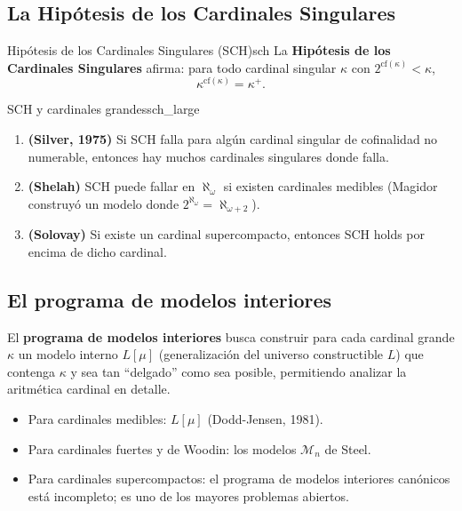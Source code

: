 \subsection{La Hipótesis de los Cardinales Singulares}

\begin{definicion}{Hipótesis de los Cardinales Singulares (SCH)}{sch}
La \textbf{Hipótesis de los Cardinales Singulares} afirma: para todo cardinal singular $\kappa$ con $2^{\mathrm{cf}(\kappa)} < \kappa$,
\[
  \kappa^{\mathrm{cf}(\kappa)} = \kappa^+.
\]
\end{definicion}

\begin{teorema}{SCH y cardinales grandes}{sch_large}
\begin{enumerate}[leftmargin=2em, label=(\roman*)]
  \item \textbf{(Silver, 1975)} Si SCH falla para algún cardinal singular de cofinalidad no numerable, entonces hay muchos cardinales singulares donde falla.
  \item \textbf{(Shelah)} SCH puede fallar en $\aleph_\omega$ si existen cardinales medibles (Magidor construyó un modelo donde $2^{\aleph_\omega} = \aleph_{\omega+2}$).
  \item \textbf{(Solovay)} Si existe un cardinal supercompacto, entonces SCH holds por encima de dicho cardinal.
\end{enumerate}
\end{teorema}

\subsection{El programa de modelos interiores}

El \textbf{programa de modelos interiores} busca construir para cada cardinal grande $\kappa$ un modelo interno $L[\mu]$ (generalización del universo constructible $L$) que contenga $\kappa$ y sea tan ``delgado'' como sea posible, permitiendo analizar la aritmética cardinal en detalle.

\begin{itemize}[leftmargin=2em]
  \item Para cardinales medibles: $L[\mu]$ (Dodd-Jensen, 1981).
  \item Para cardinales fuertes y de Woodin: los modelos $\mathcal{M}_n$ de Steel.
  \item Para cardinales supercompactos: el programa de modelos interiores canónicos está incompleto; es uno de los mayores problemas abiertos.
\end{itemize}

